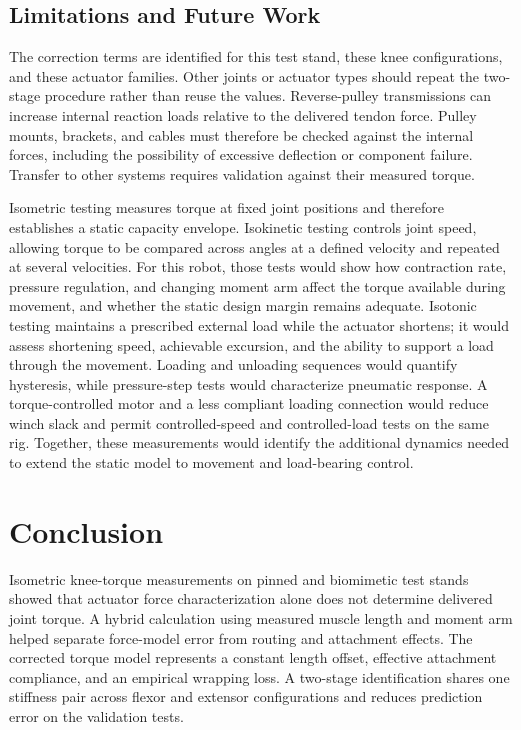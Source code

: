 \documentclass[utf8]{FrontiersinHarvard} %
\begin{document}
\subsection{Limitations and Future Work}\label{sec:limitations}

 The correction terms are identified for this test stand, these knee configurations, and these actuator families. Other joints or actuator types should repeat the two-stage procedure rather than reuse the values. Reverse-pulley transmissions can increase internal reaction loads relative to the delivered tendon force. Pulley mounts, brackets, and cables must therefore be checked against the internal forces, including the possibility of excessive deflection or component failure. Transfer to other systems requires validation against their measured torque. 

Isometric testing measures torque at fixed joint positions and therefore establishes a static capacity envelope. Isokinetic testing controls joint speed, allowing torque to be compared across angles at a defined velocity and repeated at several velocities. For this robot, those tests would show how contraction rate, pressure regulation, and changing moment arm affect the torque available during movement, and whether the static design margin remains adequate. Isotonic testing maintains a prescribed external load while the actuator shortens; it would assess shortening speed, achievable excursion, and the ability to support a load through the movement. Loading and unloading sequences would quantify hysteresis, while pressure-step tests would characterize pneumatic response. A torque-controlled motor and a less compliant loading connection would reduce winch slack and permit controlled-speed and controlled-load tests on the same rig. Together, these measurements would identify the additional dynamics needed to extend the static model to movement and load-bearing control.

\section{Conclusion}\label{sec:conclusion}

Isometric knee-torque measurements on pinned and biomimetic test stands showed that actuator force characterization alone does not determine delivered joint torque. A hybrid calculation using measured muscle length and moment arm helped separate force-model error from routing and attachment effects. The corrected torque model represents a constant length offset, effective attachment compliance, and an empirical wrapping loss. A two-stage identification shares one stiffness pair across flexor and extensor configurations and reduces prediction error on the validation tests.
\end{document}
